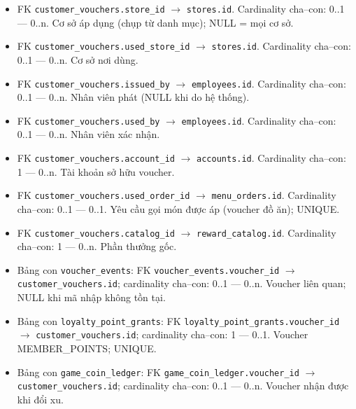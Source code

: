\begin{itemize}

\item FK \texttt{customer\_vouchers.store\_id} $\rightarrow$ \texttt{stores.id}. Cardinality cha--con: 0..1 — 0..n. Cơ sở áp dụng (chụp từ danh mục); NULL = mọi cơ sở.

\item FK \texttt{customer\_vouchers.used\_store\_id} $\rightarrow$ \texttt{stores.id}. Cardinality cha--con: 0..1 — 0..n. Cơ sở nơi dùng.

\item FK \texttt{customer\_vouchers.issued\_by} $\rightarrow$ \texttt{employees.id}. Cardinality cha--con: 0..1 — 0..n. Nhân viên phát (NULL khi do hệ thống).

\item FK \texttt{customer\_vouchers.used\_by} $\rightarrow$ \texttt{employees.id}. Cardinality cha--con: 0..1 — 0..n. Nhân viên xác nhận.

\item FK \texttt{customer\_vouchers.account\_id} $\rightarrow$ \texttt{accounts.id}. Cardinality cha--con: 1 — 0..n. Tài khoản sở hữu voucher.

\item FK \texttt{customer\_vouchers.used\_order\_id} $\rightarrow$ \texttt{menu\_orders.id}. Cardinality cha--con: 0..1 — 0..1. Yêu cầu gọi món được áp (voucher đồ ăn); UNIQUE.

\item FK \texttt{customer\_vouchers.catalog\_id} $\rightarrow$ \texttt{reward\_catalog.id}. Cardinality cha--con: 1 — 0..n. Phần thưởng gốc.

\item Bảng con \texttt{voucher\_events}: FK \texttt{voucher\_events.voucher\_id} $\rightarrow$ \texttt{customer\_vouchers.id}; cardinality cha--con: 0..1 — 0..n. Voucher liên quan; NULL khi mã nhập không tồn tại.

\item Bảng con \texttt{loyalty\_point\_grants}: FK \texttt{loyalty\_point\_grants.voucher\_id} $\rightarrow$ \texttt{customer\_vouchers.id}; cardinality cha--con: 1 — 0..1. Voucher MEMBER_POINTS; UNIQUE.

\item Bảng con \texttt{game\_coin\_ledger}: FK \texttt{game\_coin\_ledger.voucher\_id} $\rightarrow$ \texttt{customer\_vouchers.id}; cardinality cha--con: 0..1 — 0..n. Voucher nhận được khi đổi xu.

\end{itemize}

